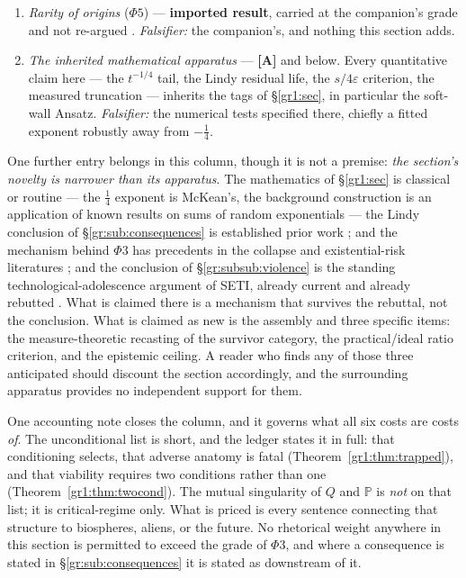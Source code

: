\documentclass[11pt]{article}
\numberwithin{equation}{section}
\theoremstyle{plain}
\theoremstyle{definition}
\theoremstyle{remark}
\newcommand{\PP}{\mathbb{P}}
\begin{document}
\begin{enumerate}[itemsep=2pt]
\item \emph{Rarity of origins} ($\Phi5$) --- \textbf{imported result},
carried at the companion's grade and not re-argued
\cite{Nexus, Ben26Found, Ben26Optimal}. \emph{Falsifier:} the
companion's, and nothing this section adds.

\item \emph{The inherited mathematical apparatus} --- \textbf{[A]} and
below. Every quantitative claim here --- the $t^{-1/4}$ tail, the Lindy
residual life, the $s/4\varepsilon$ criterion, the measured truncation
--- inherits the tags of \S\ref{gr1:sec}, in
particular the soft-wall Ansatz. \emph{Falsifier:} the numerical tests
specified there, chiefly a fitted exponent robustly away from
$-\tfrac14$.
\end{enumerate}

\noindent One further entry belongs in this column, though it is not a
premise: \emph{the section's novelty is narrower than its apparatus}.
The mathematics of \S\ref{gr1:sec} is classical or routine --- the
$\tfrac14$ exponent is McKean's, the background construction is an
application of known results on sums of random exponentials --- the Lindy
conclusion of \S\ref{gr:sub:consequences} is established prior work
\cite{BC21,BG24,Kip20,Ord23}; and the mechanism behind $\Phi3$ has
precedents in the collapse and existential-risk literatures
\cite{Tainter88,Bostrom19,EF24}; and the conclusion of
\S\ref{gr:subsub:violence} is the standing technological-adolescence
argument of SETI, already current and already rebutted
\cite{Cooper19}. What is claimed there is a mechanism that survives the
rebuttal, not the conclusion. What is claimed as new is the assembly
and three specific items: the measure-theoretic recasting of the
survivor category, the practical/ideal ratio criterion, and the
epistemic ceiling. A reader who finds any of those three anticipated
should discount the section accordingly, and the surrounding apparatus
provides no independent support for them.

One accounting note closes the column, and it governs what all
six costs are costs \emph{of}. The unconditional list is short, and the
ledger states it in full: that conditioning selects, that adverse
anatomy is fatal (Theorem~\ref{gr1:thm:trapped}), and that viability
requires two conditions rather than one
(Theorem~\ref{gr1:thm:twocond}). The mutual singularity of $Q$ and
$\PP$ is \emph{not} on that list; it is critical-regime only. What is priced is every sentence connecting that structure to
biospheres, aliens, or the future. No rhetorical weight anywhere in this
section is permitted to exceed the grade of $\Phi3$, and where a
consequence is stated in \S\ref{gr:sub:consequences} it is stated as
downstream of it.
\end{document}
